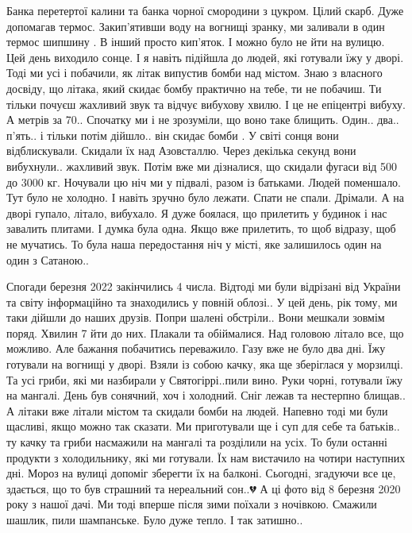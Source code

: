 Банка перетертої калини та банка чорної  смородини  з цукром. Цілий скарб. Дуже
допомагав термос. Закип'ятивши воду на вогнищі зранку, ми заливали в один
термос шипшину .  В інший просто кип'яток. І можно було не йти на вулицю. Цей
день виходило сонце. І я навіть підійшла до людей, які готували їжу у дворі.
Тоді ми усі і  побачили, як літак випустив бомби над містом. Знаю з власного
досвіду, що літака, який скидає бомбу практично на тебе, ти не побачиш.  Ти
тільки почуєш жахливий звук та відчує вибухову хвилю. І це не епіцентрі вибуху.
А метрів за 70..   Спочатку ми і не зрозуміли, що воно таке блищить. Один..
два.. п'ять.. і тільки потім дійшло.. він скидає бомби . У світі сонця вони
відблискували.  Скидали їх над Азовсталлю.  Через декілька секунд вони
вибухнули.. жахливий звук. Потім вже ми дізналися, що скидали фугаси від 500 до
3000 кг. Ночували цю ніч ми у підвалі,  разом із  батьками. Людей  поменшало.
Тут було не холодно.  І навіть зручно було лежати. Спати не спали. Дрімали. А
на дворі гупало, літало, вибухало.  Я дуже боялася, що прилетить у будинок і
нас завалить плитами. І думка була одна. Якщо вже прилетить, то щоб відразу,
щоб не мучатись.  То була наша передостання ніч у місті, яке залишилось один на
один з Сатаною..

Спогади березня 2022 закінчились 4 числа. Відтоді ми були відрізані від України
та світу інформаційно та знаходились у повній облозі.. У цей день, рік тому, ми
таки дійшли до наших друзів. Попри шалені обстріли.. Вони мешкали зовмім поряд.
Хвилин 7 йти до них. Плакали та обіймалися.  Над головою літало все, що
можливо. Але бажання побачитись переважило.  Газу вже не було два дні. Їжу
готували на вогнищі у дворі.  Взяли із собою качку, яка ще зберіглася у
морзилці. Та усі гриби, які ми назбирали у Святогіррі..пили вино. Руки чорні,
готували їжу на мангалі.  День був сонячний, хоч і холодний.  Сніг лежав та
нестерпно блищав.. А літаки вже літали містом та скидали бомби на людей.
Напевно тоді ми були щасливі, якщо можно так сказати.  Ми приготували ще і суп
для себе та батьків.. ту качку та гриби насмажили на мангалі та розділили на
усіх. То були останні продукти з холодильнику, які ми готували. Їх нам
вистачило на чотири наступних дні. Мороз на вулиці допоміг зберегти їх на
балконі.  Сьогодні, згадуючи все це, здається, що то був страшний та нереальний
сон..💔 А ці фото від 8 березня  2020 року з нашої дачі. Ми тоді вперше після
зими поїхали з ночівкою. Смажили шашлик, пили шампанське.  Було дуже тепло. І
так затишно..

